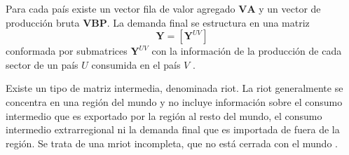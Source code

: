 Para cada país existe un vector fila de valor agregado $\textbf{VA}$ y un vector de producción bruta $\textbf{VBP}$. La demanda final se estructura en una matriz 
\begin{equation}\textbf{Y} = \left[ \textbf{Y}^{UV} \right]\end{equation}
conformada por submatrices $\textbf{Y}^{UV}$ con la información de la producción de cada sector de un país $U$ consumida en el país $V$ \parencite[p.~10]{Xing2022}.

Existe un tipo de matriz intermedia, denominada \gls{riot}. La \gls{riot} generalmente se concentra en una región del mundo y no incluye información sobre el consumo intermedio que es exportado por la región al resto del mundo, el consumo intermedio extrarregional ni la demanda final que es importada de fuera de la región. Se trata de una \gls{mriot} incompleta, que no está cerrada con el mundo \parencite[p.~19]{Durán2021}.


